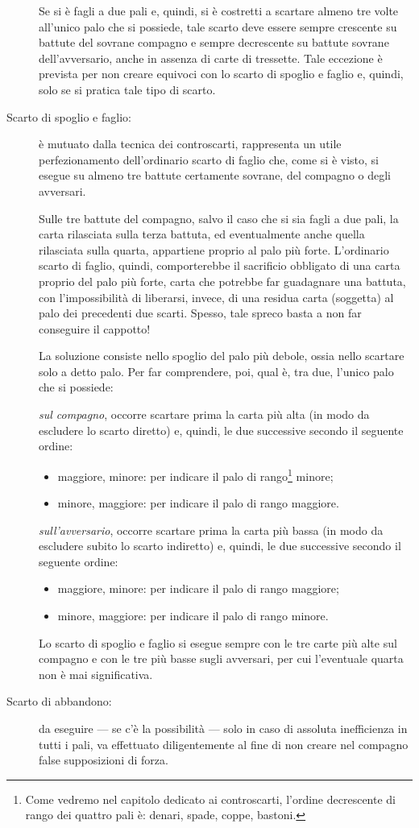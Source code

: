 \documentclass[italian,a4paper]{article}
\newenvironment{packeditem}{
\begin{itemize}
  \setlength{\itemsep}{1pt}
  \setlength{\parskip}{0pt}
  \setlength{\parsep}{0pt}
}{\end{itemize}}
\begin{document}
\begin{description}
Se si è fagli a due pali e, quindi, si è costretti a scartare almeno tre volte all'unico palo che si possiede, tale scarto deve essere sempre crescente su battute del sovrane compagno e sempre decrescente su battute sovrane dell'avversario, anche in assenza di carte di tressette.
Tale eccezione è prevista per non creare equivoci con lo scarto di spoglio e faglio e, quindi, solo se si pratica tale tipo di scarto.
    \item[Scarto di spoglio e faglio:] 
è mutuato dalla tecnica dei controscarti, rappresenta un utile perfezionamento dell'ordinario scarto di faglio che, come si è visto, si esegue su almeno tre battute certamente sovrane, del compagno o degli avversari.

Sulle tre battute del compagno, salvo il caso che si sia fagli a due pali, la carta rilasciata sulla terza battuta, ed eventualmente anche quella rilasciata sulla quarta, appartiene proprio al palo più forte.
L'ordinario scarto di faglio, quindi, comporterebbe il sacrificio obbligato di una carta proprio del palo più forte, carta che potrebbe far guadagnare una battuta, con l'impossibilità di liberarsi, invece, di una residua carta (soggetta) al palo dei precedenti due scarti.  
Spesso, tale spreco basta a non far conseguire il cappotto!

La soluzione consiste nello spoglio del palo più debole, ossia nello scartare solo a detto palo. Per far comprendere, poi, qual è, tra due, l'unico palo che si possiede:

\emph{sul compagno}, occorre scartare prima la carta più alta (in modo da escludere lo scarto diretto) e, quindi, le due successive secondo il seguente ordine:
\begin{packeditem}
\item maggiore, minore: per indicare il palo di rango\footnote{Come
vedremo nel capitolo dedicato ai controscarti, l'ordine decrescente di rango
dei quattro pali è: denari, spade, coppe, bastoni.} minore;
\item minore, maggiore: per indicare il palo di rango maggiore.
\end{packeditem}
\emph{sull'avversario}, occorre scartare prima la carta più bassa (in modo da escludere subito lo scarto indiretto) e, quindi, le due successive secondo il seguente ordine:
\begin{packeditem}
\item maggiore, minore: per indicare il palo di rango maggiore;
\item minore, maggiore: per indicare il palo di rango minore.
\end{packeditem}
 
Lo scarto di spoglio e faglio si esegue sempre con le tre carte più alte sul compagno e con le tre più basse sugli avversari, per cui l'eventuale quarta non è mai significativa.
    \item[Scarto di abbandono:] 
 da eseguire --- se c'è la possibilità --- solo in caso di assoluta inefficienza in tutti i pali, va effettuato diligentemente al fine di non creare nel compagno false supposizioni di forza.
\end{description}
\end{document}
